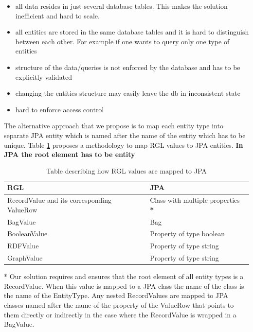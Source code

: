 \begin{itemize}
	\item all data resides in just several database tables. This makes the solution inefficient and hard to scale.
	\item all entities are stored in the same database tables and it is hard to distinguish between each other. For example if one wants to query only one type of entities
	\item structure of the data/queries is not enforced by the database and has to be explicitly validated
	\item changing the entities structure may easily leave the db in inconsistent state
	\item hard to enforce access control
\end{itemize}

The alternative approach that we propose is to map each entity type into separate JPA entity which is named after the name of the entity which has to be unique. Table \ref{tbl:rgl2gpa} proposes a methodology to map RGL values to JPA entities. \textbf{In JPA the root element has to be entity}

\begin{table}[h]
    \begin{tabular}{ | l | l |}
    \hline
    RGL & JPA  \\ \hline
    RecordValue and its corresponding ValueRow & Class with multiple properties \textbf{*}  \\ \hline
    BagValue & Bag  \\ \hline
    BooleanValue & Property of type boolean  \\ \hline
    RDFValue & Property of type string  \\ \hline
	GraphValue & Property of type string  \\ \hline
	
    \end{tabular}
     \caption{Table describing how RGL values are mapped to JPA}
    \label{tbl:rgl2gpa}
\end{table}

* Our solution requires and ensures that the root element of all entity types is a RecordValue. When this value is mapped to a JPA class the name of the class is the name of the EntityType. Any nested RecordValues are mapped to JPA classes named after the name of the property of the ValueRow that points to them directly or indirectly in the case where the RecordValue is wrapped in a BagValue. 

